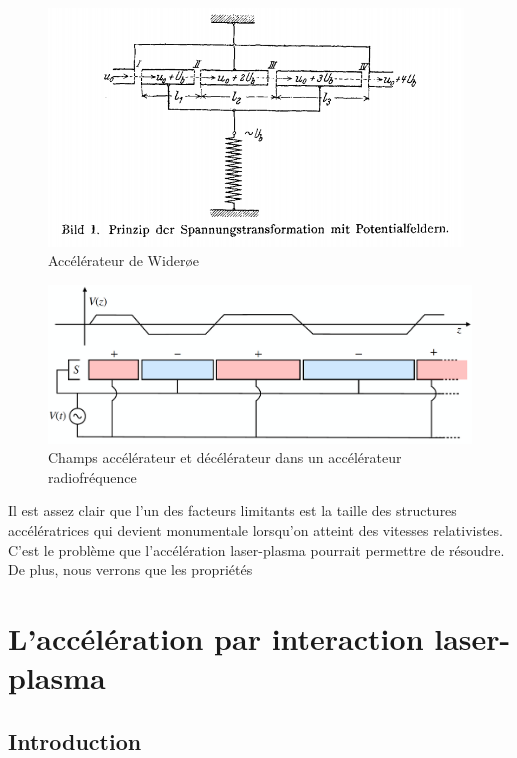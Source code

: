 \documentclass[a4paper]{book}
\begin{document}
\begin{figure}[!htbp]
\begin{center}
\includegraphics[width=11cm]{pictures/Wideroe.png}
\end{center}
\caption{Accélérateur de Wider{\o}e~\cite{Wideroe1928}}
\label{fig:wideroe}
\end{figure}

\begin{figure}[!htbp]
\begin{center}
\includegraphics[width=15cm]{pictures/AccWideroe.png}
\end{center}
\caption{Champs accélérateur et décélérateur dans un accélérateur radiofréquence}
\label{fig:acc_dec}
\end{figure}

Il est assez clair que l'un des facteurs limitants est la taille des structures accélératrices qui devient monumentale lorsqu'on atteint des vitesses relativistes. C'est le problème que l'accélération laser-plasma pourrait permettre de résoudre. De plus, nous verrons que les propriétés 


\section{L'accélération par interaction laser-plasma}

\subsection{Introduction}
\end{document}

